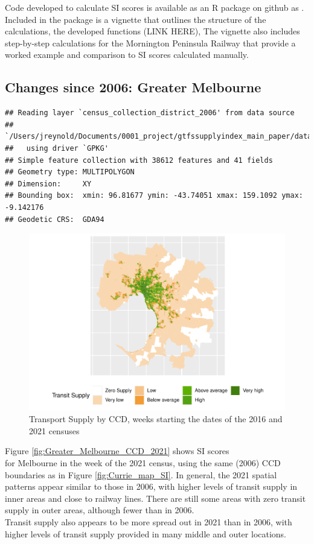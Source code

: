 \documentclass[preprint, 3p,
authoryear]{elsarticle} %
\begin{document}
Code developed to calculate SI scores is available as an R package on
github as \citet{gtfssupplyindex_github}. Included in the package is a
vignette that outlines the structure of the calculations, the developed
functions (LINK HERE), The vignette also includes step-by-step
calculations for the Mornington Peninsula Railway that provide a worked
example and comparison to SI scores calculated manually.

\subsection{Changes since 2006: Greater
Melbourne}\label{changes-since-2006-greater-melbourne-1}

\begin{verbatim}
## Reading layer `census_collection_district_2006' from data source 
##   `/Users/jreynold/Documents/0001_project/gtfssupplyindex_main_paper/data/asgc2006.gpkg' 
##   using driver `GPKG'
## Simple feature collection with 38612 features and 41 fields
## Geometry type: MULTIPOLYGON
## Dimension:     XY
## Bounding box:  xmin: 96.81677 ymin: -43.74051 xmax: 159.1092 ymax: -9.142176
## Geodetic CRS:  GDA94
\end{verbatim}

\begin{figure}
\centering
\includegraphics{Leveraging_GTFS_to_assess_transit_supply_Transport_Geography_files/figure-latex/Greater_Melbourne_CCD_2021-1.pdf}
\caption{Transport Supply by CCD, weeks starting the dates of the 2016
and 2021 censuses}
\end{figure}

Figure \ref{fig:Greater_Melbourne_CCD_2021} shows SI scores\\
for Melbourne in the week of the 2021 census, using the same (2006) CCD
boundaries as in Figure \ref{fig:Currie_map_SI}. In general, the 2021
spatial patterns appear similar to those in 2006, with higher levels of
transit supply in inner areas and close to railway lines. There are
still some areas with zero transit supply in outer areas, although fewer
than in 2006.\\
Transit supply also appears to be more spread out in 2021 than in 2006,
with higher levels of transit supply provided in many middle and outer
locations.
\end{document}
